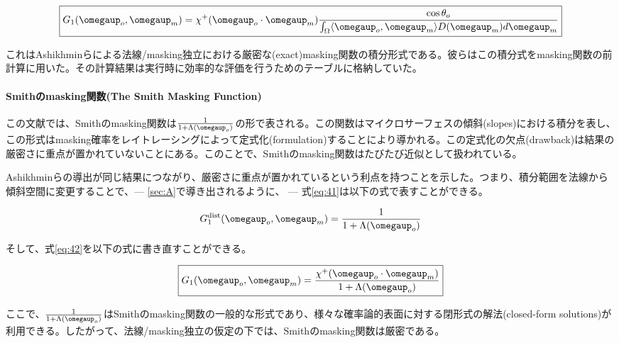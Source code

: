 \documentclass[a4j,xelatex,ja=standard]{bxjsarticle}
\begin{document}
\begin{equation}
    \boxed{
    G_1(\boldsymbol{\omegaup}_o, \boldsymbol{\omegaup}_m) = \chi^+(\boldsymbol{\omegaup}_o \cdot \boldsymbol{\omegaup}_m) \frac{\cos\theta_o}{\int_{\Omega} \langle \boldsymbol{\omegaup}_o, \boldsymbol{\omegaup}_m \rangle D(\boldsymbol{\omegaup}_m) d\boldsymbol{\omegaup}_m}
    }
    \label{eq:42}
\end{equation}

これはAshikhminらによる法線/masking独立における厳密な(exact)masking関数の積分形式である。彼らはこの積分式をmasking関数の前計算に用いた。その計算結果は実行時に効率的な評価を行うためのテーブルに格納していた。

\paragraph{Smithのmasking関数(The Smith Masking Function)}

この文献では、Smithのmasking関数は$\frac{1}{1 + \Lambda(\boldsymbol{\omegaup}_o)}$の形で表される。この関数はマイクロサーフェスの傾斜(slopes)における積分を表し、この形式はmasking確率をレイトレーシングによって定式化(formulation)することにより導かれる。この定式化の欠点(drawback)は結果の厳密さに重点が置かれていないことにある。このことで、Smithのmasking関数はたびたび近似として扱われている。

Ashikhminらの導出が同じ結果につながり、厳密さに重点が置かれているという利点を持つことを示した。つまり、積分範囲を法線から傾斜空間に変更することで、--- \ref{sec:A}で導き出されるように、 --- 式\eqref{eq:41}は以下の式で表すことができる。

\begin{equation*}
    G_1^{\text{dist}}(\boldsymbol{\omegaup}_o, \boldsymbol{\omegaup}_m) = \frac{1}{1 + \Lambda(\boldsymbol{\omegaup}_o)}
\end{equation*}

そして、式\eqref{eq:42}を以下の式に書き直すことができる。

\begin{equation}
    \boxed{
    G_1(\boldsymbol{\omegaup}_o, \boldsymbol{\omegaup}_m) = \frac{\chi^+(\boldsymbol{\omegaup}_o \cdot \boldsymbol{\omegaup}_m)}{1 + \Lambda(\boldsymbol{\omegaup}_o)}
    }
    \label{eq:43}
\end{equation}

ここで、$\frac{1}{1 + \Lambda(\boldsymbol{\omegaup}_o)}$はSmithのmasking関数の一般的な形式であり、様々な確率論的表面に対する閉形式の解法(closed-form solutions)が利用できる。したがって、法線/masking独立の仮定の下では、Smithのmasking関数は厳密である。
\end{document}
